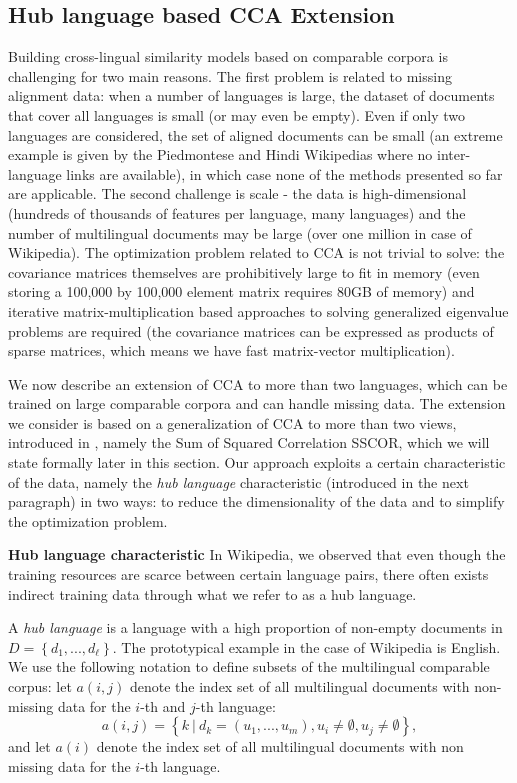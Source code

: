 \documentclass[twoside,11pt]{article}
\begin{document}
\subsection{Hub language based CCA Extension}\label{sec:hublang}
Building cross-lingual similarity models based on comparable corpora is challenging for two main reasons. The first problem is related to missing alignment data: when a number of languages is large, the dataset of documents that cover all languages is small (or may even be empty). Even if only two languages are considered, the set of aligned documents can be small (an extreme example is given by the Piedmontese and Hindi Wikipedias where no inter-language links are available), in which case none of the methods presented so far are applicable.
 The second challenge is scale - the data is high-dimensional (hundreds of thousands of features per language, many languages) and the number of multilingual documents may be large (over one million in case of Wikipedia). The optimization problem related to CCA is not
 trivial to solve: the covariance matrices themselves are prohibitively large to fit in memory (even storing a 100,000 by 100,000 element matrix requires 80GB of memory) and iterative matrix-multiplication based approaches to  solving generalized eigenvalue problems are required (the covariance matrices can be expressed as products of sparse matrices, which means we have fast matrix-vector multiplication).

We now describe an extension of CCA to more than two languages, which can be trained on large comparable corpora and can handle missing data.
 The extension we consider is based on a generalization of CCA to more than two views, introduced in \cite{Kettenring}, namely the Sum of Squared Correlation SSCOR, which we will state formally later in this section. Our approach exploits a certain characteristic of the data, namely the \emph{hub language} characteristic (introduced in the next paragraph) in two
 ways: to reduce the dimensionality of the data and to simplify the optimization problem.

\textbf{Hub language characteristic}
In Wikipedia, we observed that even though the training resources are scarce between certain language pairs, there often exists indirect training data through what we refer to as a hub language.

A \emph{hub language} is a language with a high proportion of non-empty documents in $D = \left\{d_1,..., d_{\ell}\right\}$. The prototypical example in the case of Wikipedia is English. We use the following notation to define subsets of the multilingual comparable corpus: let $a(i,j)$ denote the index set of all multilingual documents with non-missing data for the $i$-th and $j$-th language:  $$a(i,j) = \left\{k~ |~ d_k = (u_1,...,u_m), u_i \neq \emptyset, u_j \neq \emptyset \right\},$$ and let $a(i)$ denote the index set of all multilingual documents with non missing data for the $i$-th language.
\end{document}
